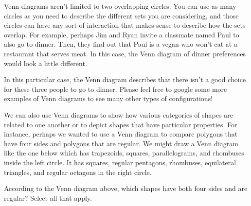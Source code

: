 \documentclass{ximera}
\begin{document}
Venn diagrams aren't limited to two overlapping circles. You can use as many circles as you need to describe the different sets you are considering, and those circles can have any sort of interaction that makes sense to describe how the sets overlap. For example, perhaps Jim and Ryan invite a classmate named Paul to also go to dinner. Then, they find out that Paul is a vegan who won't eat at a restaurant that serves meat. In this case, the Venn diagram of dinner preferences would look a little different.
\begin{image}
\end{image}
In this particular case, the Venn diagram describes that there isn't a good choice for these three people to go to dinner. Please feel free to google some more examples of Venn diagrams to see many other types of configurations!

We can also use Venn diagrams to show how various categories of shapes are related to one another or to depict shapes that have particular properties. For instance, perhaps we wanted to use a Venn diagram to compare polygons that have four sides and polygons that are regular. We might draw a Venn diagram like the one below which has trapezoids, squares, parallelograms, and rhombuses inside the left circle. It has squares, regular pentagons, rhombuses, equilateral triangles, and regular octagons in the right circle.

\begin{image}
\end{image}

\begin{question}
According to the Venn diagram above, which shapes have both four sides and are regular? Select all that apply.
\begin{selectAll}
\end{selectAll}
\end{question}
\end{document}
